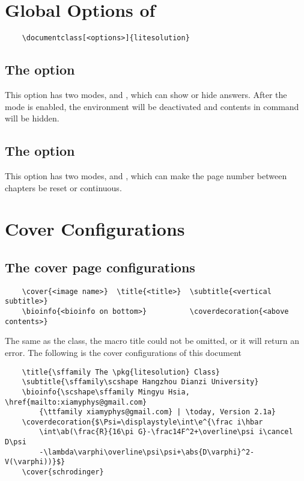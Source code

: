 \documentclass[ans,mtpro2]{litesolution}
\begin{document}
\section{Global Options of }

\begin{verbatim}
    \documentclass[<options>]{litesolution}
\end{verbatim}

\subsection{The  option}

This option has two modes,  and , which can show or hide answers. After the  mode is enabled, the environment  will be deactivated and contents in command  will be hidden.

\subsection{The  option}

This option has two modes,  and , which can make the page number between chapters be reset or continuous.

\section{Cover Configurations}

\subsection{The cover page configurations}

\begin{verbatim}
    \cover{<image name>}  \title{<title>}  \subtitle{<vertical subtitle>}
    \bioinfo{<bioinfo on bottom>}          \coverdecoration{<above contents>}
\end{verbatim}

The same as the  class, the macro title could not be omitted, or it will return an error. The following is the cover configurations of this document

\begin{verbatim}
    \title{\sffamily The \pkg{litesolution} Class}
    \subtitle{\sffamily\scshape Hangzhou Dianzi University}
    \bioinfo{\scshape\sffamily Mingyu Hsia, \href{mailto:xiamyphys@gmail.com}
        {\ttfamily xiamyphys@gmail.com} | \today, Version 2.1a}
    \coverdecoration{$\Psi=\displaystyle\int\e^{\frac i\hbar
        \int\ab(\frac{R}{16\pi G}-\frac14F^2+\overline\psi i\cancel D\psi
        -\lambda\varphi\overline\psi\psi+\abs{D\varphi}^2-V(\varphi))}$}
    \cover{schrodinger}
\end{verbatim}
\end{document}
